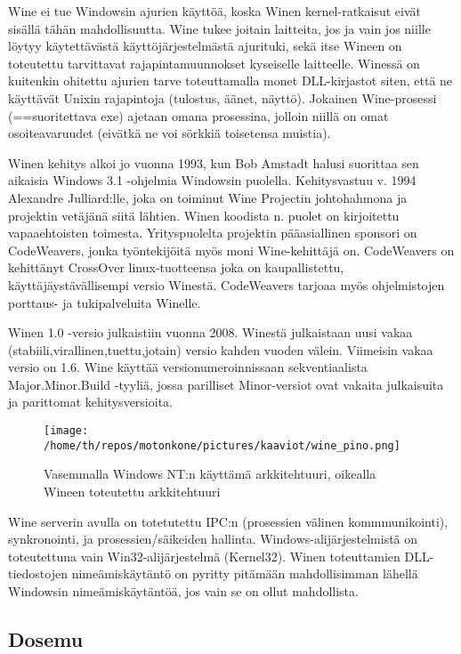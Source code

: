 \documentclass[11pt,a4paper,oneside,article]{memoir}
\begin{document}
Wine ei tue Windowsin ajurien käyttöä, koska Winen kernel-ratkaisut eivät sisällä tähän mahdollisuutta. Wine tukee joitain laitteita, jos ja vain jos niille löytyy käytettävästä käyttöjärjestelmästä ajurituki, sekä itse Wineen on toteutettu tarvittavat rajapintamuunnokset kyseiselle laitteelle. Winessä on kuitenkin ohitettu ajurien tarve toteuttamalla monet DLL-kirjastot siten, että ne käyttävät Unixin rajapintoja (tulostus, äänet, näyttö). Jokainen Wine-prosessi (==suoritettava exe) ajetaan omana prosessina, jolloin niillä on omat osoiteavaruudet (eivätkä ne voi sörkkiä toisetensa muistia).

Winen kehitys alkoi jo vuonna 1993, kun Bob Amstadt halusi suorittaa sen aikaisia Windows 3.1 -ohjelmia Windowsin puolella. Kehitysvastuu v. 1994 Alexandre Julliard:lle, joka on toiminut Wine Projectin johtohahmona ja projektin vetäjänä siitä lähtien. Winen koodista n. puolet on kirjoitettu vapaaehtoisten toimesta. Yrityspuolelta projektin pääasiallinen sponsori on CodeWeavers, jonka työntekijöitä myös moni Wine-kehittäjä on. CodeWeavers on kehittänyt CrossOver linux-tuotteensa joka on kaupallistettu, käyttäjäystävällisempi versio Winestä. CodeWeavers tarjoaa myös ohjelmistojen porttaus- ja tukipalveluita Winelle.

Winen 1.0 -versio julkaistiin vuonna 2008. Winestä julkaistaan uusi vakaa (stabiili,virallinen,tuettu,jotain) versio kahden vuoden välein. Viimeisin vakaa versio on 1.6. Wine käyttää versionumeroinnissaan sekventiaalista Major.Minor.Build -tyyliä, jossa parilliset Minor-versiot ovat vakaita julkaisuita ja parittomat kehitysversioita. 

\lipsum[1-3]

\begin{figure}[H]
\centering
\texttt{[image: /home/th/repos/motonkone/pictures/kaaviot/wine\_pino.png]}
\caption{Vasemmalla Windows NT:n käyttämä arkkitehtuuri, oikealla Wineen toteutettu arkkitehtuuri}
\end{figure}

Wine serverin avulla on totetutettu IPC:n (prosessien välinen kommmunikointi), synkronointi, ja prosessien/säikeiden hallinta. Windows-alijärjestelmistä on toteutettuna vain Win32-alijärjestelmä (Kernel32). Winen toteuttamien DLL-tiedostojen nimeämiskäytäntö on pyritty pitämään mahdollisimman lähellä Windowsin nimeämiskäytäntöä, jos vain se on ollut mahdollista. \cite{wine:architecture}

\subsection{Dosemu}
\end{document}
